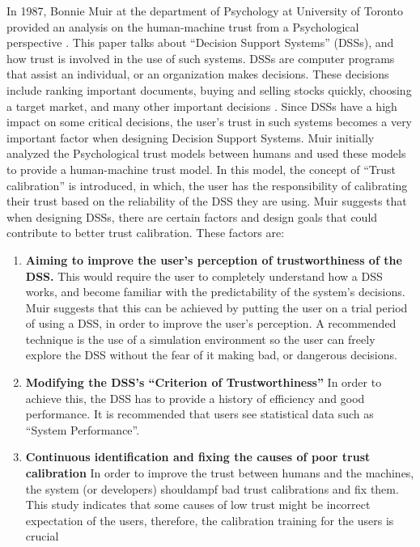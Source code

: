 \documentclass[runningheads,a4paper]{llncs}
\begin{document}
In 1987, Bonnie Muir at the department of Psychology at University of Toronto provided an analysis on the human-machine trust from a Psychological perspective \cite{muir1987trust}. This paper talks about ``Decision Support Systems'' (DSSs), and how trust is involved in the use of such systems. DSSs are computer programs that assist an individual, or an organization makes decisions. These decisions include ranking important documents, buying and selling stocks quickly, choosing a target market, and many other important decisions \cite{decisionSupportTrust}. Since DSSs have a high impact on some critical decisions, the user's trust in such systems becomes a very important factor when designing  Decision Support Systems. Muir initially analyzed the Psychological trust models between humans and used these models to provide a human-machine trust model. In this model, the concept of ``Trust calibration'' is introduced, in which, the user has the responsibility of calibrating their trust based on the reliability of the DSS they are using. Muir suggests that when designing DSSs, there are certain factors and design goals that could contribute to better trust calibration. These factors are:
 \begin{enumerate}
     \item \textbf{Aiming to improve the user's perception of trustworthiness of the DSS.}
     This would require the user to completely understand how a DSS works, and become familiar with the predictability of the system's decisions. Muir suggests that this can be achieved by putting the user on a trial period of using a DSS, in order to improve the user's perception. A recommended technique is the use of a simulation environment so the user can freely explore the DSS without the fear of it making bad, or dangerous decisions.
     \item \textbf{Modifying the DSS's ``Criterion of Trustworthiness''}
 In order to achieve this, the DSS has to provide a history of efficiency and good performance. It is recommended that users see statistical data such as ``System Performance''.
     \item \textbf{Continuous identification and fixing the causes of poor trust calibration}
 In order to improve the trust between humans and the machines, the system (or developers) shouldampf bad trust calibrations and fix them. This study indicates that some causes of low trust might be incorrect expectation of the users, therefore, the calibration training for the users is crucial
 \end{enumerate}
\end{document}
